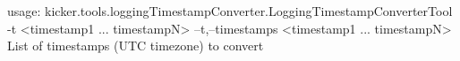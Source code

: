 usage: kicker.tools.loggingTimestampConverter.LoggingTimestampConverterTool -t
       <timestamp1 ... timestampN>
 --t,--timestamps <timestamp1 ... timestampN>
        List of timestamps (UTC timezone) to convert
